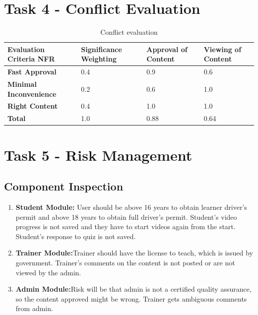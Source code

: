\documentclass{report}
\begin{document}
\section{Task 4 - Conflict Evaluation}
\begin{table}[htb]
    \centering
    \begin{tabular}{|p{3cm}|p{3cm}|p{3cm}|p{3cm}|}
\hline
\textbf{Evaluation Criteria NFR}&\textbf{Significance Weighting}&\textbf{Approval of Content}&\textbf{Viewing of Content}\\ \hline
\textbf{Fast Approval}&0.4&0.9&0.6\\ \hline
\textbf{Minimal Inconvenience}&0.2&0.6&1.0\\ \hline
\textbf{Right Content}&0.4&1.0&1.0\\ \hline
\textbf{Total}&1.0&0.88&0.64\\ \hline
\end{tabular}
    \caption{Conflict evaluation}
    \label{tab:my_label}
\end{table}

\section{Task 5 - Risk Management}
\subsection{Component Inspection}
    \begin{enumerate}
        \item \textbf{Student Module:} User should be above 16 years to obtain learner driver's permit and above 18 years to obtain full driver's permit. Student's video progress is not saved and they have to start videos again from the start. Student's response to quiz is not saved.
        \item \textbf{Trainer Module:}Trainer should have the license to teach, which is issued by government. Trainer's comments on the content is not posted or are not viewed by the admin.
        \item \textbf{Admin Module:}Risk will be that admin is not a certified quality assurance, so the content approved might be wrong. Trainer gets ambiguous comments from admin.
    \end{enumerate}
\end{document}
